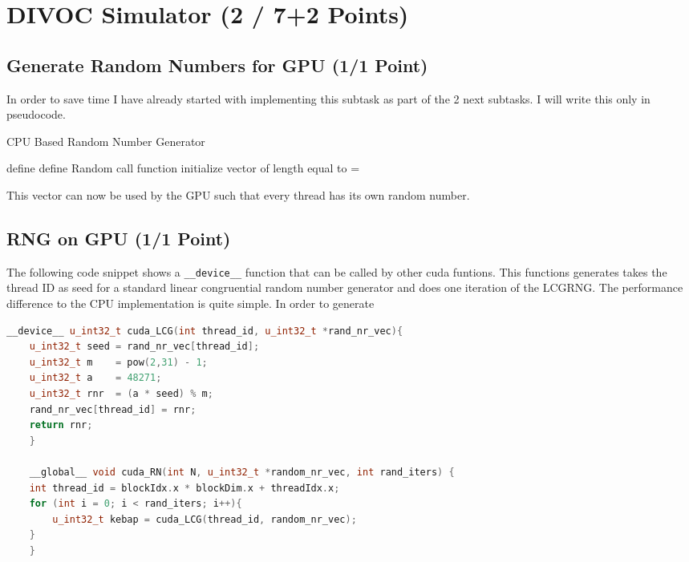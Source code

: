 \section{DIVOC Simulator (2 / 7+2 Points)}
\subsection{Generate Random Numbers for GPU (1/1 Point)}


In order to save time I have already started with implementing this subtask as
part of the 2 next subtasks. I will write this only in pseudocode.

\begin{algorithm}
	\renewcommand{\thealgorithm}{}
	\caption{CPU Based Random Number Generator}
	\begin{algorithmic}[1]
	\State define 
    \State define Random  
    \State call function  
    \State initialize vector  of length equal to 
    \State {}
        \State {} = 
    \EndFor
	\end{algorithmic}
\end{algorithm}

This vector  can now be used by the GPU such that every thread has its own random number.


\subsection{RNG on GPU (1/1 Point)}
The following code snippet shows a \texttt{\_\_device\_\_} function that can be called by other  cuda funtions.
This functions generates takes the thread ID as seed for a standard linear congruential random number generator and does
one iteration of the LCGRNG. The performance difference to the CPU implementation is quite simple. In order to
generate 

\begin{lstlisting}[language=C++, title=C++ code for ]
__device__ u_int32_t cuda_LCG(int thread_id, u_int32_t *rand_nr_vec){
    u_int32_t seed = rand_nr_vec[thread_id];
    u_int32_t m    = pow(2,31) - 1;
    u_int32_t a    = 48271;
    u_int32_t rnr  = (a * seed) % m; 
    rand_nr_vec[thread_id] = rnr;
    return rnr;
    }
    
    __global__ void cuda_RN(int N, u_int32_t *random_nr_vec, int rand_iters) {
    int thread_id = blockIdx.x * blockDim.x + threadIdx.x;
    for (int i = 0; i < rand_iters; i++){
        u_int32_t kebap = cuda_LCG(thread_id, random_nr_vec);
    }
    }
\end{lstlisting}

